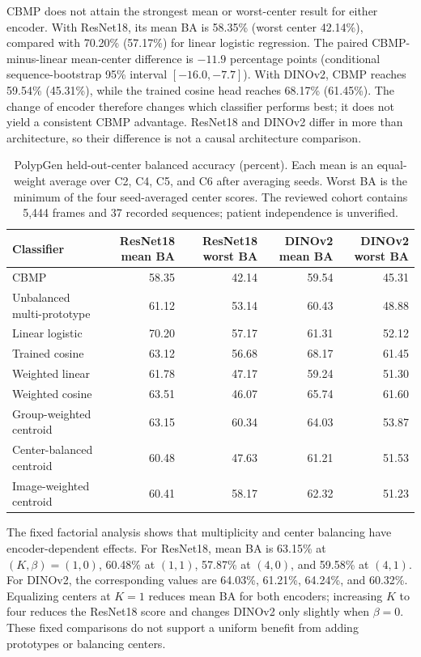 CBMP does not attain the strongest mean or worst-center result for either encoder. With ResNet18, its mean BA is 58.35\% (worst center 42.14\%), compared with 70.20\% (57.17\%) for linear logistic regression. The paired CBMP-minus-linear mean-center difference is $-11.9$ percentage points (conditional sequence-bootstrap 95\% interval $[-16.0,-7.7]$). With DINOv2, CBMP reaches 59.54\% (45.31\%), while the trained cosine head reaches 68.17\% (61.45\%). The change of encoder therefore changes which classifier performs best; it does not yield a consistent CBMP advantage. ResNet18 and DINOv2 differ in more than architecture, so their difference is not a causal architecture comparison.

\begin{table}[t]
\centering\small
\setlength{\tabcolsep}{5pt}
\begin{tabular}{lrrrr}
\hline
Classifier & ResNet18 mean BA & ResNet18 worst BA & DINOv2 mean BA & DINOv2 worst BA \\
\hline
CBMP & 58.35 & 42.14 & 59.54 & 45.31 \\
Unbalanced multi-prototype & 61.12 & 53.14 & 60.43 & 48.88 \\
Linear logistic & 70.20 & 57.17 & 61.31 & 52.12 \\
Trained cosine & 63.12 & 56.68 & 68.17 & 61.45 \\
Weighted linear & 61.78 & 47.17 & 59.24 & 51.30 \\
Weighted cosine & 63.51 & 46.07 & 65.74 & 61.60 \\
Group-weighted centroid & 63.15 & 60.34 & 64.03 & 53.87 \\
Center-balanced centroid & 60.48 & 47.63 & 61.21 & 51.53 \\
Image-weighted centroid & 60.41 & 58.17 & 62.32 & 51.23 \\
\hline
\end{tabular}
\caption{PolypGen held-out-center balanced accuracy (percent). Each mean is an equal-weight average over C2, C4, C5, and C6 after averaging seeds. Worst BA is the minimum of the four seed-averaged center scores. The reviewed cohort contains 5,444 frames and 37 recorded sequences; patient independence is unverified.}
\label{tab:polypgen_results}
\end{table}

The fixed factorial analysis shows that multiplicity and center balancing have encoder-dependent effects. For ResNet18, mean BA is 63.15\% at $(K,\beta)=(1,0)$, 60.48\% at $(1,1)$, 57.87\% at $(4,0)$, and 59.58\% at $(4,1)$. For DINOv2, the corresponding values are 64.03\%, 61.21\%, 64.24\%, and 60.32\%. Equalizing centers at $K=1$ reduces mean BA for both encoders; increasing $K$ to four reduces the ResNet18 score and changes DINOv2 only slightly when $\beta=0$. These fixed comparisons do not support a uniform benefit from adding prototypes or balancing centers.

